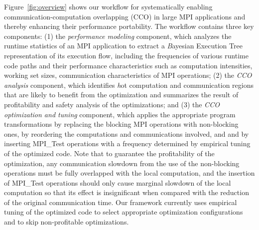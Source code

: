 Figure~\ref{fig:overview} shows our workflow for systematically enabling communication-computation overlapping (CCO) in large MPI
applications and thereby enhancing their performance portability.
The workflow contains three key components:  (1) the \emph{performance modeling} component,
which analyzes the runtime statistics of an MPI application to extract a {\emph Bayesian Execution Tree\cite{jichi:ipdps14}} representation of
its execution flow, including the frequencies of various runtime code paths and their performance characteristics such as computation intensities,
working set sizes,  communication characteristics of MPI operations;
(2) the \emph{CCO analysis} component, which identifies {\emph hot} computation and communication regions
 that are likely to benefit from the optimization and  summarizes the result of profitability and safety analysis of the optimizations;
and (3) the \emph{CCO optimization and tuning} component, which applies the appropriate program transformations by replacing the blocking MPI operations with
non-blocking ones, by reordering the computations and communications involved, and
  and by inserting MPI\_Test operations with a frequency determined by empirical tuning of the optimized code.
Note that to guarantee the profitability of the optimization,
any communication slowdown from the use of the non-blocking operations must be fully overlapped with the local computation,
and the insertion of MPI\_Test operations should only cause marginal slowdown of the local computation so that its effect is
insignificant when compared with the reduction of the original communication time.
Our framework currently uses empirical tuning of the optimized code to select appropriate optimization configurations and to skip non-profitable optimizations.

